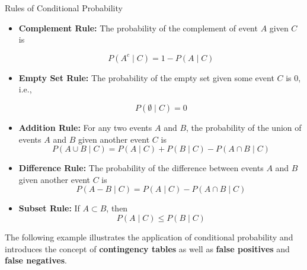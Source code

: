 \begin{theorem}{Rules of Conditional Probability}
    \begin{itemize}
        \item \textbf{Complement Rule:} The probability of the complement of event $A$ given $C$ is
    
        \[
        P\left(A^c \mid C\right)=1-P(A \mid C)
        \]

        \item \textbf{Empty Set Rule:} The probability of the empty set given some event $C$ is 0, i.e.,
        
        \[P(\emptyset \mid C) = 0\]
        
        \item \textbf{Addition Rule:} For any two events $A$ and $B$, the probability of the union of events $A$ and $B$ given another event $C$ is
        \[
        P(A \cup B \mid C)=P(A \mid C)+P(B \mid C)-P(A \cap B \mid C)
        \]

        \item \textbf{Difference Rule:} The probability of the difference between events $A$ and $B$ given another event $C$ is
        \[
            P(A-B \mid C)=P(A \mid C)-P(A \cap B \mid C)
        \]
        \item \textbf{Subset Rule:} If $A \subset B$, then
        \[
        P(A \mid C) \leq P(B \mid C)
        \]
    \end{itemize}
\end{theorem}

The following example illustrates the application of conditional probability and introduces the concept of \textbf{contingency tables} as well as \textbf{false positives} and \textbf{false negatives}.

